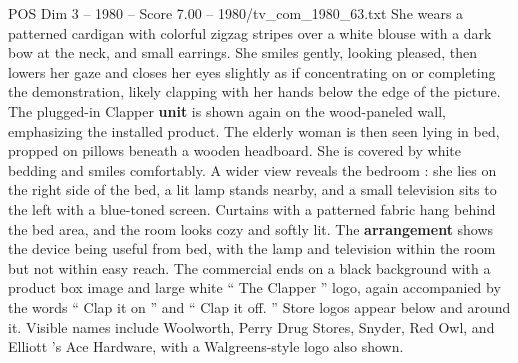 \begin{textsample}{POS Dim 3 – 1980 – Score 7.00 – 1980/tv\_com\_1980\_63.txt}
She wears a patterned cardigan with colorful zigzag stripes over a white blouse with a dark bow at the neck, and small earrings.
She smiles gently, looking pleased, then lowers her gaze and closes her eyes slightly as if concentrating on or completing the demonstration, likely clapping with her hands below the edge of the picture.
The plugged-in Clapper \textbf{unit} is shown again on the wood-paneled wall, emphasizing the installed product.
The elderly woman is then seen lying in bed, propped on pillows beneath a wooden headboard.
She is covered by white bedding and smiles comfortably.
A wider view reveals the bedroom : she lies on the right side of the bed, a lit lamp stands nearby, and a small television sits to the left with a blue-toned screen.
Curtains with a patterned fabric hang behind the bed area, and the room looks cozy and softly lit.
The \textbf{arrangement} shows the device being useful from bed, with the lamp and television within the room but not within easy reach.
The commercial ends on a black background with a product box image and large white “ The Clapper ” logo, again accompanied by the words “ Clap it on ” and “ Clap it off. ” Store logos appear below and around it.
Visible names include Woolworth, Perry Drug Stores, Snyder, Red Owl, and Elliott ’s Ace Hardware, with a Walgreens-style logo also shown.

\end{textsample}
